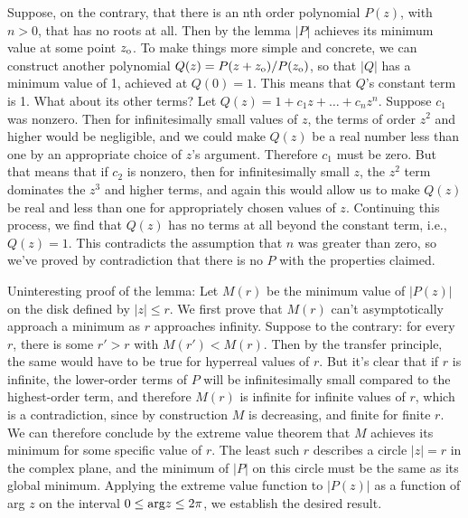 Suppose, on the contrary, that there is an nth order polynomial $P(z)$, with $n>0$, that has
no roots at all. Then by the lemma $|P|$ achieves its minimum value
at some point $z_{\textup{o}}$. To make things more
simple and concrete, we can construct another polynomial $Q(z)=P(z+z_{\textup{o}})/P(z_{\textup{o}})$,
so that $|Q|$ has a minimum value of 1, achieved at $Q(0)=1$. This means that
$Q$'s constant term is 1. What about its other terms? Let $Q(z)=1+c_1z+\ldots+c_nz^n$.
Suppose $c_1$ was nonzero.
Then for infinitesimally small values of $z$, the terms of order $z^2$ and higher
would be negligible, and we could make $Q(z)$ be a real number less than one by
an appropriate choice of $z$'s argument. Therefore $c_1$ must be zero. But that means
that if $c_2$ is nonzero, then for infinitesimally small $z$, the $z^2$ term dominates
the $z^3$ and higher terms, and again this would allow us to make $Q(z)$ be real and
less than one for appropriately chosen values of $z$. Continuing this process, we
find that $Q(z)$ has no terms at all beyond the constant term, i.e., $Q(z)=1$. This
contradicts the assumption that $n$ was greater than zero, so we've proved by
contradiction that there is no $P$ with the properties claimed.

Uninteresting proof of the lemma: Let $M(r)$ be the minimum value of $|P(z)|$ on the disk defined by $|z| \le r$.
We first prove that $M(r)$ can't asymptotically approach a minimum as $r$ approaches infinity.
Suppose to the contrary: for every $r$, there is some $r'>r$ with $M(r')<M(r)$.
Then by the transfer principle, the same would have to be true for
hyperreal values of $r$. But it's clear that if $r$ is infinite, the lower-order terms of $P$
will be infinitesimally small compared to the highest-order term, and therefore $M(r)$ is
infinite for infinite values of $r$, which is a contradiction, since by construction $M$ is
decreasing, and finite for finite $r$. We can therefore conclude
by the extreme value theorem that $M$ achieves its minimum for some specific value of $r$.
The least such $r$ describes a circle $|z|=r$ in the complex plane, and the minimum of $|P|$
on this circle must be the same as its global minimum. Applying the extreme value function
to $|P(z)|$ as a function of arg $z$ on the interval $0 \le \textup{arg} z \le 2\pi$, we establish
the desired result.
